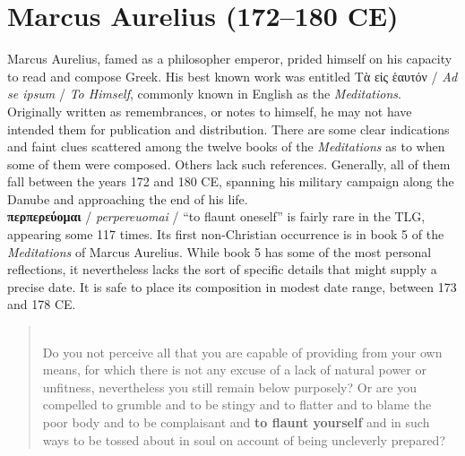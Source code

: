 %
%
\chapter{Marcus Aurelius (172--180 CE)}%
\vspace*{3mm}%
\justifying%
%
\noindent{}Marcus Aurelius, famed as a philosopher emperor, %
prided himself on his capacity to read and compose Greek. %
His best known work was entitled Τὰ εἰς ἑαυτόν / \textit{Ad se ipsum} / \textit{To Himself}, %
commonly known in English as the \textit{Meditations}. %
Originally written as remembrances, or notes to himself, %
he may not have intended them for publication and distribution. %
There are some clear indications and faint clues scattered among the twelve books of the \textit{Meditations} %
as to when some of them were composed. %
Others lack such references. %
Generally, all of them fall between the years 172 and 180 CE, %
spanning his military campaign along the Danube and approaching the end of his life. \\[1.5mm] %

\noindent{}\textbf{περπερεύομαι} / \textit{perpereuomai} / “to flaunt oneself” %
is fairly rare in the TLG, appearing some 117 times. %
Its first non-Christian occurrence is in book 5 of the \textit{Meditations} of Marcus Aurelius. %
While book 5 has some of the most personal reflections, %
it nevertheless lacks the sort of specific details that might supply a precise date. %
It is safe to place its composition in modest date range, between 173 and 178 CE. %

\vspace*{2mm} 
 \begin{quote}\\[1mm] %
 Do you not perceive all that you are capable of providing from your own means, %
 for which there is not any excuse of a lack of natural power or unfitness, %
 nevertheless you still remain below purposely? %
 Or are you compelled to grumble and to be stingy and to flatter and to blame the poor body %
 and to be complaisant and \textbf{to flaunt yourself} and in such ways to be tossed about in soul %
 on account of being uncleverly prepared? \end{quote} %
\vspace*{2mm}

